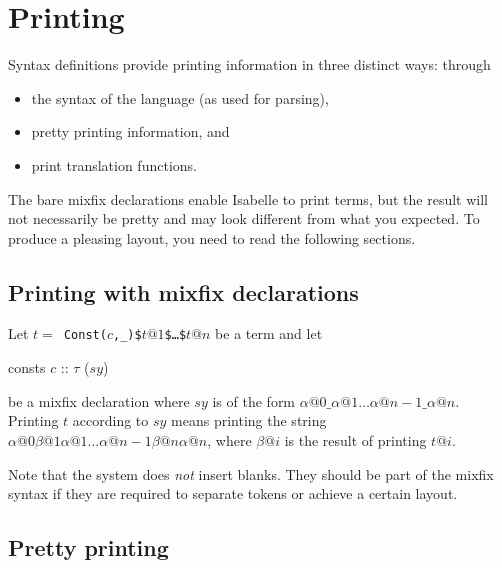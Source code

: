 

\section{Printing}

Syntax definitions provide printing information in three distinct ways:
through
\begin{itemize}
\item the syntax of the language (as used for parsing),
\item pretty printing information, and
\item print translation functions.
\end{itemize}
The bare mixfix declarations enable Isabelle to print terms, but the result
will not necessarily be pretty and may look different from what you expected.
To produce a pleasing layout, you need to read the following sections.

\subsection{Printing with mixfix declarations}

Let {\tt$t =$ Const($c$,_)\$$t@1$\$\dots\$$t@n$} be a term and let
\begin{ttbox}
consts \(c\) :: \(\tau\) (\(sy\))
\end{ttbox}
be a mixfix declaration where $sy$ is of the form
$\alpha@0\_\alpha@1\dots\alpha@{n-1}\_\alpha@n$.  Printing $t$ according to
$sy$ means printing the string
$\alpha@0\beta@1\alpha@1\ldots\alpha@{n-1}\beta@n\alpha@n$, where $\beta@i$
is the result of printing $t@i$.

Note that the system does {\em not\/} insert blanks.  They should be part of
the mixfix syntax if they are required to separate tokens or achieve a
certain layout.

\subsection{Pretty printing}
\label{PrettyPrinting}

